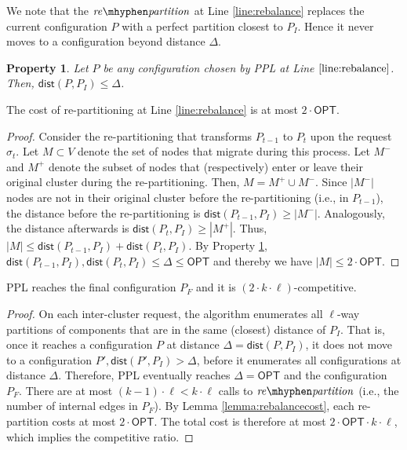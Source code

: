 \documentclass[manuscript,screen=true]{acmart}
\newcommand{\OPT}{\textsf{OPT}\xspace}
\newcommand{\PPL}{\textsf{PPL}\xspace}
\newcommand{\dist}{\textsf{dist}}
\newtheorem{property}{Property}
\newcommand\mahmoud[1]{\color{green}\textbf{\\ Mahmoud: #1}\\\color{black}}
\newcommand\maciek[1]{\color{brown}\textbf{\\ Maciek: #1}\color{black}}
\begin{document}
      We note that the $\mathit{re\mhyphen partition}$ at Line \ref{line:rebalance} replaces the current configuration $P$ with a perfect partition closest to $P_I$.
Hence it never moves to a configuration beyond distance $\Delta$.      
\begin{property} \label{prop:dist<OPT}
    Let $P$ be any configuration chosen by \PPL at Line $\ref{line:rebalance}$.
    Then, $\dist(P,P_I) \leq \Delta$.
\end{property}

\begin{lemma}	\label{lemma:rebalancecost}
    The cost of re-partitioning at Line \ref{line:rebalance} is at most $2\cdot\OPT$.
\end{lemma}
\begin{proof}
    Consider the re-partitioning that transforms $P_{t-1}$ to $P_t$ upon the request $\sigma_t$.
    Let $M \subset V$ denote the set of nodes that migrate during this process.
	Let $M^-$ and $M^+$ denote the subset of nodes that (respectively)
    enter or leave their original cluster during the re-partitioning.    
    Then,
    $M = M^+ \cup M^-$.
    Since $|M^-|$ nodes are not in their original cluster before the re-partitioning (i.e., in $P_{t-1}$),
    the distance before the re-partitioning is $\dist(P_{t-1},P_I) \geq | M^-|$.
    Analogously,
     the distance afterwards is $\dist(P_{t},P_I) \geq | M^+|$.
    Thus,
    $|M| \leq \dist(P_{t-1},P_I) + \dist(P_{t},P_I)$.
    By Property \ref{prop:dist<OPT},
    $\dist(P_{t-1},P_I) , \dist(P_{t},P_I) \leq \Delta \leq \OPT$
    and thereby we have	
    $|M| \leq 2\cdot\OPT$.
\end{proof}

\begin{theorem}	\label{thm:upperbound}
    \PPL reaches the final configuration $P_F$ and it is $(2\cdot k\cdot\ell)$-competitive.
\end{theorem}
\begin{proof}
      On each inter-cluster request,
     the algorithm enumerates all $\ell$-way partitions of components
     that are in the same (closest) distance of $P_I$.
     That is, 
     once it reaches a configuration $P$ at distance $\Delta = \dist(P, P_I)$,
     it does not move to a configuration
     $P', \dist(P', P_I) > \Delta$,
     before it enumerates all configurations at distance $\Delta$.
     Therefore,
     \PPL eventually reaches $\Delta=\OPT$ and the configuration $P_F$.
    There are at most $(k-1)\cdot\ell < k\cdot\ell $ calls   to $\mathit{re\mhyphen partition}$
     (i.e., the number of internal edges in $P_F$).
    By Lemma \ref{lemma:rebalancecost},
    each re-partition costs at most $2\cdot\OPT$.
    The total cost is therefore at most $2\cdot\OPT\cdot k\cdot\ell$, which implies the competitive ratio.
 \end{proof}
\end{document}
